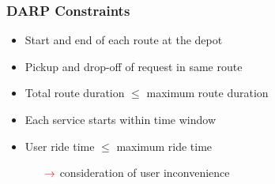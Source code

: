 \documentclass[aspectratio=1610]{beamer}
\let\oldfootnotesize\footnotesize
\renewcommand*{\footnotesize}{\oldfootnotesize\fontsize{6}{4}\selectfont}
\renewcommand{\footnotesize}{\scriptsize}
\begin{document}
\begin{frame}
	\frametitle{DARP Constraints \footnotesize{\textcolor{gray}{\cite{Cordeau:2003}}}}
	
\begin{itemize}
	\itemsep2ex
	\item Start and end of each route at the depot
	\item Pickup and drop-off of request in same route 
	\item Total route duration $\leq$ maximum route duration
	\item Each service starts within time window
	\item User ride time $\leq$ maximum ride time 
		\begin{itemize}
			\item[$\color{red}{\rightarrow}$] consideration of user inconvenience %
		\end{itemize}
\end{itemize}
	
\end{frame}


\end{document}

